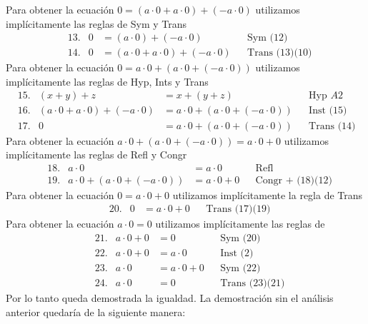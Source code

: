 \documentclass[a4paper]{article}
\begin{document}
Para obtener la ecuación \(0 = (a \cdot 0 + a \cdot 0) + (-a \cdot 0)\)
utilizamos implícitamente las reglas de Sym y Trans
\begin{align*}
    &\text{13.} & 0 &= (a \cdot 0) + (-a \cdot 0) & &\text{Sym (12)} \\
    &\text{14.} & 0 &= (a \cdot 0 + a \cdot 0) + (-a \cdot 0)  & &\text{Trans (13)(10)}
\end{align*}
Para obtener la ecuación \(0 = a \cdot 0 + (a \cdot 0 + (-a \cdot 0))\)
utilizamos implícitamente las reglas de Hyp, Ints y Trans
\begin{align*}
    &\text{15.} & (x + y) + z &= x + (y + z) & &\text{Hyp } A2 \\
    &\text{16.} &  (a \cdot 0 + a \cdot 0) + (-a \cdot 0) &= a \cdot 0 + (a \cdot 0 + (-a \cdot 0))  & &\text{Inst (15)} \\
    &\text{17.} &  0 &= a \cdot 0 + (a \cdot 0 + (-a \cdot 0))  & &\text{Trans (14)(16)}
\end{align*}
Para obtener la ecuación \(a \cdot 0 + (a \cdot 0 + (-a \cdot 0)) = a \cdot 0 + 0\)
utilizamos implícitamente las reglas de Refl y Congr
\begin{align*}
    &\text{18.} & a \cdot 0 &= a \cdot 0 & &\text{Refl} \\
    &\text{19.} & a \cdot 0 + (a \cdot 0 + (-a \cdot 0)) &= a \cdot 0 + 0  & &\text{Congr + (18)(12)}
\end{align*}
Para obtener la ecuación \(0 = a \cdot 0 + 0\) utilizamos implícitamente la regla de Trans
\begin{align*}
    &\text{20.} & 0 &= a \cdot 0 + 0 & &\text{Trans (17)(19)}
\end{align*}
Para obtener la ecuación \(a \cdot 0 = 0\) utilizamos implícitamente las reglas de
\begin{align*}
    &\text{21.} & a \cdot 0 + 0 &= 0 & &\text{Sym (20)} \\
    &\text{22.} & a \cdot 0 + 0 &= a \cdot 0 & &\text{Inst (2)} \\
    &\text{23.} & a \cdot 0 &= a \cdot 0 + 0 & &\text{Sym (22)} \\
    &\text{24.} & a \cdot 0 &= 0 & &\text{Trans (23)(21)}
\end{align*}
Por lo tanto queda demostrada la igualdad.
\newline 
La demostración sin el análisis anterior quedaría de la siguiente manera:
\end{document}
